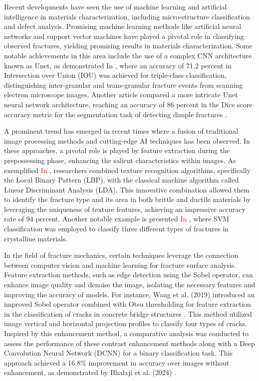 \documentclass[preprint,12pt]{elsarticle}
\begin{document}
    Recent developments have seen the use of machine learning and artificial intelligence in materials characterization, including micro-structure classification and defect analysis.
    Promising machine learning methods like artificial neural networks and support vector machines have played a pivotal role in classifying observed fractures, yielding promising results in materials characterization.
    Some notable achievements in this area include the use of a complex CNN architecture known as Unet,
    as demonstrated In \cite{tsopanidis2020toward}, where an accuracy of 71.2 percent in Intersection over Union (IOU) was achieved for triple-class classification,
    distinguishing inter-granular and trans-granular fracture events from scanning electron microscope images.
    Another article compared a more intricate Unet neural network architecture, reaching an accuracy of 86 percent in the Dice score accuracy metric for the segmentation task of detecting dimple fractures \cite{sinha2021deep}.

    A prominent trend has emerged in recent times where a fusion of traditional image processing methods and cutting-edge AI techniques has been observed.
    In these approaches, a pivotal role is played by feature extraction during the prepossessing phase, enhancing the salient characteristics within images.
    As exemplified \textcolor{red}{In \cite{naik2019identification}}, researchers combined texture recognition algorithms, specifically the Local Binary Pattern (LBP), with the classical machine algorithm called Linear Discriminant Analysis (LDA). This innovative combination allowed them to identify the fracture type and its area in both brittle and ductile materials by leveraging the uniqueness of texture features, achieving an impressive accuracy rate of 94 percent.
    Another notable example is presented \textcolor{red}{In \cite{bastidas2016fractographic}}, where SVM classification was employed to classify three different types of fractures in crystalline materials.

       In the field of fracture mechanics, certain techniques leverage the connection between computer vision and machine learning for fracture surface analysis. Feature extraction methods, such as edge detection using the Sobel operator, can enhance image quality and denoise the image, isolating the necessary features and improving the accuracy of models. For instance, Wang et al. (2019) introduced an improved Sobel operator combined with Otsu thresholding for feature extraction in the classification of cracks in concrete bridge structures \cite{wang2019research}. This method utilized image vertical and horizontal projection profiles to classify four types of cracks.
    Inspired by this enhancement method, a comparative analysis was conducted to assess the performance of these contrast enhancement methods along with a Deep Convolution Neural Network (DCNN) for a binary classification task. This approach achieved a 16.8\% improvement in accuracy over images without enhancement, as demonstrated by Bhalaji et al. (2024) \cite{bhalaji2024transfer}.
\end{document}
